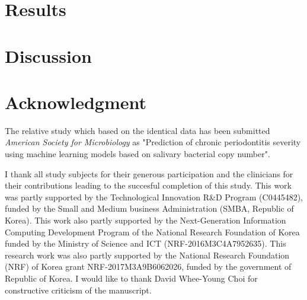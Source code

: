 \documentclass[aps, 11pt, a4paper]{article}
\begin{document}
    \section{Results}
    
    \section{Discussion}
    
    \section{Acknowledgment}
    	The relative study which based on the identical data has been submitted \textit{American Society for Microbiology} as "Prediction of chronic periodontitis severity using machine learning models based on salivary bacterial copy number". 
    	
    	I thank all study subjects for their generous participation and the clinicians for their contributions leading to the succesful completion of this study. This work was partly supported by the Technological Innovation R\&D Program (C0445482), funded by the Small and Medium business Administration (SMBA, Republic of Korea). This work also partly supported by the Next-Generation Information Computing Development Program of the National Research Foundation of Korea funded by the Ministry of Science and ICT (NRF-2016M3C4A7952635). This research work was also partly supported by the National Research Foundation (NRF) of Korea grant NRF-2017M3A9B6062026, funded by the government of Republic of Korea. I would like to thank David Whee-Young Choi for constructive criticism of the manuscript. 
    
    
    
\end{document}
